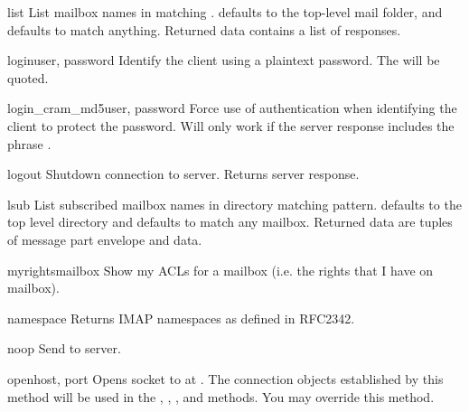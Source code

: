 \begin{methoddesc}[IMAP4]{list}{}
  List mailbox names in  matching
  .   defaults to the top-level mail
  folder, and  defaults to match anything.  Returned data
  contains a list of  responses.
\end{methoddesc}

\begin{methoddesc}[IMAP4]{login}{user, password}
  Identify the client using a plaintext password.
  The  will be quoted.
\end{methoddesc}

\begin{methoddesc}[IMAP4]{login_cram_md5}{user, password}
  Force use of  authentication when identifying the
  client to protect the password.  Will only work if the server
   response includes the phrase .
\end{methoddesc}

\begin{methoddesc}[IMAP4]{logout}{}
  Shutdown connection to server. Returns server  response.
\end{methoddesc}

\begin{methoddesc}[IMAP4]{lsub}{}
  List subscribed mailbox names in directory matching pattern.
   defaults to the top level directory and
   defaults to match any mailbox.
  Returned data are tuples of message part envelope and data.
\end{methoddesc}

\begin{methoddesc}[IMAP4]{myrights}{mailbox}
  Show my ACLs for a mailbox (i.e. the rights that I have on mailbox).
\end{methoddesc}

\begin{methoddesc}[IMAP4]{namespace}{}
  Returns IMAP namespaces as defined in RFC2342.
\end{methoddesc}

\begin{methoddesc}[IMAP4]{noop}{}
  Send  to server.
\end{methoddesc}

\begin{methoddesc}[IMAP4]{open}{host, port}
  Opens socket to  at .
  The connection objects established by this method
  will be used in the , , , and
   methods.
  You may override this method.
\end{methoddesc}

